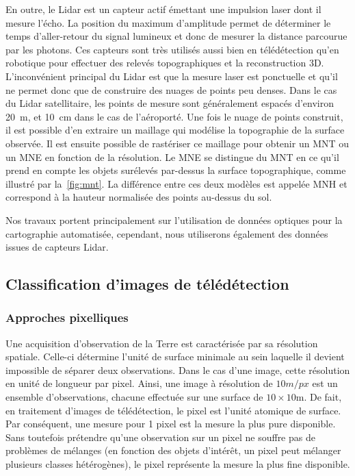 En outre, le \gls{Lidar} est un capteur actif émettant une impulsion laser dont il mesure l'écho. La position du maximum d'amplitude permet de déterminer le temps d'aller-retour du signal lumineux et donc de mesurer la distance parcourue par les photons. Ces capteurs sont très utilisés aussi bien en télédétection qu'en robotique pour effectuer des relevés topographiques et la reconstruction 3D. L'inconvénient principal du \gls{Lidar} est que la mesure laser est ponctuelle et qu'il ne permet donc que de construire des nuages de points peu denses. Dans le cas du \gls{Lidar} satellitaire, les points de mesure sont généralement espacés d'environ \SI{20}{\meter}, et \SI{10}{\centi\meter} dans le cas de l'aéroporté. Une fois le nuage de points construit, il est possible d'en extraire un maillage qui modélise la topographie de la surface observée. Il est ensuite possible de rastériser ce maillage pour obtenir un \gls{MNT} ou un \gls{MNE} en fonction de la résolution. Le \gls{MNE} se distingue du \gls{MNT} en ce qu'il prend en compte les objets surélevés par-dessus la surface topographique, comme illustré par la~\cref{fig:mnt}. La différence entre ces deux modèles est appelée \gls{MNH} et correspond à la hauteur normalisée des points au-dessus du sol.

Nos travaux portent principalement sur l'utilisation de données optiques pour la cartographie automatisée, cependant, nous utiliserons également des données issues de capteurs \gls{Lidar}.

\subsection{Classification d'images de télédétection}

\subsubsection{Approches pixelliques}

Une acquisition d'observation de la Terre est caractérisée par sa résolution spatiale. Celle-ci détermine l'unité de surface minimale au sein laquelle il devient impossible de séparer deux observations. Dans le cas d'une image, cette résolution en unité de longueur par pixel. Ainsi, une image à résolution de $10m/px$ est un ensemble d'observations, chacune effectuée sur une surface de $10\times10$m. De fait, en traitement d'images de télédétection, le pixel est l'unité atomique de surface. Par conséquent, une mesure pour 1 pixel est la mesure la plus pure disponible. Sans toutefois prétendre qu'une observation sur un pixel ne souffre pas de problèmes de mélanges (en fonction des objets d'intérêt, un pixel peut mélanger plusieurs classes hétérogènes), le pixel représente la mesure la plus fine disponible.

